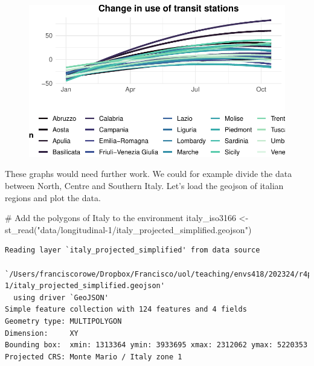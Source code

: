 \documentclass[
  letterpaper,
  DIV=11,
  numbers=noendperiod]{scrreprt}
\newenvironment{Shaded}{\begin{snugshade}}{\end{snugshade}}
\newcommand{\CommentTok}[1]{\textcolor[rgb]{0.37,0.37,0.37}{#1}}
\newcommand{\FunctionTok}[1]{\textcolor[rgb]{0.28,0.35,0.67}{#1}}
\newcommand{\NormalTok}[1]{\textcolor[rgb]{0.00,0.23,0.31}{#1}}
\newcommand{\OtherTok}[1]{\textcolor[rgb]{0.00,0.23,0.31}{#1}}
\newcommand{\SpecialCharTok}[1]{\textcolor[rgb]{0.37,0.37,0.37}{#1}}
\newcommand{\StringTok}[1]{\textcolor[rgb]{0.13,0.47,0.30}{#1}}
\begin{document}
\begin{figure}[H]

{\centering \includegraphics{longitudinal-1_files/figure-pdf/unnamed-chunk-16-2.pdf}

}

\end{figure}

These graphs would need further work. We could for example divide the
data between North, Centre and Southern Italy. Let's load the geojson of
italian regions and plot the data.

\begin{Shaded}
\begin{Highlighting}[]
\CommentTok{\# Add the polygons of Italy to the environment}
\NormalTok{italy\_iso3166 }\OtherTok{\textless{}{-}} \FunctionTok{st\_read}\NormalTok{(}\StringTok{"data/longitudinal{-}1/italy\_projected\_simplified.geojson"}\NormalTok{)}
\end{Highlighting}
\end{Shaded}

\begin{verbatim}
Reading layer `italy_projected_simplified' from data source 
  `/Users/franciscorowe/Dropbox/Francisco/uol/teaching/envs418/202324/r4ps/data/longitudinal-1/italy_projected_simplified.geojson' 
  using driver `GeoJSON'
Simple feature collection with 124 features and 4 fields
Geometry type: MULTIPOLYGON
Dimension:     XY
Bounding box:  xmin: 1313364 ymin: 3933695 xmax: 2312062 ymax: 5220353
Projected CRS: Monte Mario / Italy zone 1
\end{verbatim}

\begin{Shaded}
\end{Shaded}
\end{document}
